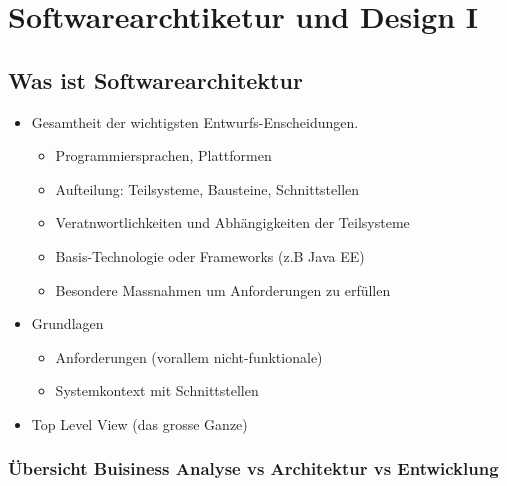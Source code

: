 \documentclass{article}
\begin{document}
\section{Softwarearchtiketur und Design I}


\subsection{Was ist Softwarearchitektur}

\begin{itemize}
	\item Gesamtheit der wichtigsten Entwurfs-Enscheidungen.
	\begin{itemize}
		\item Programmiersprachen, Plattformen
		\item Aufteilung: Teilsysteme, Bausteine, Schnittstellen
		\item Veratnwortlichkeiten und Abhängigkeiten der Teilsysteme
		\item Basis-Technologie oder Frameworks (z.B Java EE)
		\item Besondere Massnahmen um Anforderungen zu erfüllen
	\end{itemize}
	\item Grundlagen
	\begin{itemize}
		\item Anforderungen (vorallem nicht-funktionale)
		\item Systemkontext mit Schnittstellen
	\end{itemize}
	\item Top Level View (das grosse Ganze)
\end{itemize}

\subsubsection{Übersicht Buisiness Analyse vs Architektur vs Entwicklung}
\end{document}
